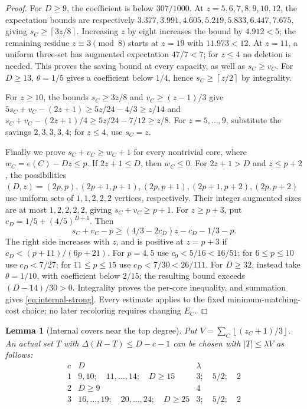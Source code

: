 \documentclass[11pt,a4paper]{article}
\newcommand{\floor}[1]{\left\lfloor#1\right\rfloor}
\newcommand{\ceil}[1]{\left\lceil#1\right\rceil}
\newtheorem{lemma}[theorem]{Lemma}
\theoremstyle{definition}
\begin{document}
\begin{proof}
For $D\ge9$, the coefficient is below $307/1000$.
At $z=5,6,7,8,9,10,12$, the expectation bounds are respectively
$3.377,3.991,4.605,5.219,5.833,6.447,7.675$, giving $s_C\ge\ceil{3z/8}$.
Increasing $z$ by eight increases the bound by $4.912<5$; the remaining residue $z\equiv3\pmod8$ starts at $z=19$ with $11.973<12$.
At $z=11$, a uniform three-set has augmented expectation $47/7<7$; for $z\le4$ no deletion is needed.
This proves the saving bound at every capacity, as well as $s_C\ge v_C$.
For $D\ge13$, $\theta=1/5$ gives a coefficient below $1/4$, hence $s_C\ge\ceil{z/2}$ by integrality.

For $z\ge10$, the bounds $s_C\ge3z/8$ and $v_C\ge(z-1)/3$ give
$5s_C+v_C-(2z+1)\ge5z/24-4/3\ge z/14$ and
$s_C+v_C-(2z+1)/4\ge5z/24-7/12\ge z/8$.
For $z=5,\ldots,9$, substitute the savings $2,3,3,3,4$; for $z\le4$, use $s_C=z$.

Finally we prove $s_C+v_C\ge w_C+1$ for every nontrivial core, where $w_C=e(C)-Dz\le p$.
If $2z+1\le D$, then $w_C\le0$. For $2z+1>D$ and $z\le p+2$, the possibilities
$(D,z)=(2p,p),(2p+1,p+1),(2p,p+1),(2p+1,p+2),(2p,p+2)$
use uniform sets of $1,1,2,2,2$ vertices, respectively. Their integer augmented sizes are at most $1,2,2,2,2$, giving $s_C+v_C\ge p+1$.
For $z\ge p+3$, put $c_D=1/5+(4/5)^{D+1}$. Then
\[
 s_C+v_C-p\ge(4/3-2c_D)z-c_D-1/3-p.
\]
The right side increases with $z$, and is positive at $z=p+3$ if $c_D<(p+11)/(6p+21)$.
For $p=4,5$ use $c_9<5/16<16/51$; for $6\le p\le10$ use $c_D<7/27$; for $11\le p\le15$ use $c_D<7/30<26/111$.
For $D\ge32$, instead take $\theta=1/10$, with coefficient below $2/15$; the resulting bound exceeds $(D-14)/30>0$.
Integrality proves the per-core inequality, and summation gives \eqref{eq:internal-strong}.
Every estimate applies to the fixed minimum-matching-cost choice; no later recoloring requires changing $E_C$.
\end{proof}
\begin{lemma}[Internal covers near the top degree]\label{lem:internal-cover}
Put $V=\sum_C\floor{(z_C+1)/3}$. An actual set $T$ with $\Delta(R-T)\le D-c-1$ can be chosen with $|T|\le\lambda V$ as follows:
\[
\begin{array}{c|c|c}
c&D&\lambda\\\hline
1&9,10;\quad11,\ldots,14;\quad D\ge15&3;\quad5/2;\quad2\\
2&D\ge9&4\\
3&16,\ldots,19;\quad20,\ldots,24;\quad D\ge25&3;\quad5/2;\quad2
\end{array}
\]
\end{lemma}
\end{document}
